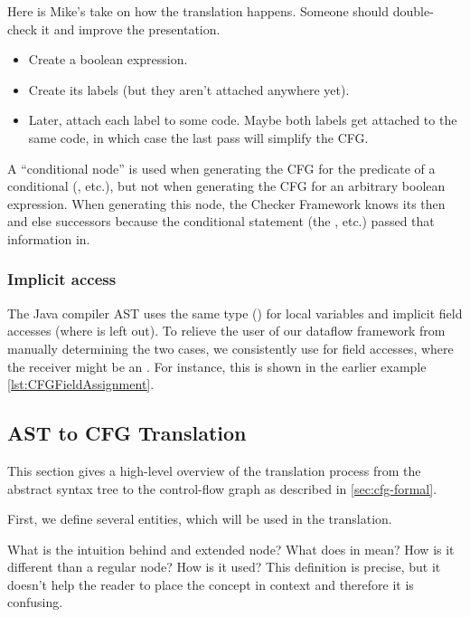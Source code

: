 \begin{workinprogress}
Here is Mike's take on how the translation happens.  Someone should
double-check it and improve the presentation.
\begin{itemize}
\item
Create a boolean expression.
\item
Create its labels (but they aren't attached anywhere yet).
\item
Later, attach each label to some code.
Maybe both labels get attached to the same code, in which case the last
pass will simplify the CFG.
\end{itemize}

A ``conditional node'' is used when generating the CFG for the predicate of
a conditional (, etc.), but not when generating the CFG for an
arbitrary boolean expression.  When generating this node, the Checker
Framework knows its then and else successors because the conditional
statement (the , etc.) passed that information in.

\end{workinprogress}


\subsubsection{Implicit  access}

The Java compiler AST uses the same type () for local variables
and implicit field accesses (where  is left out).
To relieve the user of our dataflow framework from manually determining
the two cases, we consistently use  for field accesses,
where the receiver might be an .
For instance, this is shown in the earlier example \autoref{lst:CFGFieldAssignment}.



\subsection{AST to CFG Translation}
\label{sec:ast_to_cfg_translation}

This section gives a high-level overview of the translation process from the
abstract syntax tree to the control-flow graph as described in \autoref{sec:cfg-formal}.

First, we define several entities, which will be used in the translation.

\begin{workinprogress}
What is the intuition behind and extended node?  What does in mean?  How is
it different than a regular node?  How is it used?  This definition is
precise, but it doesn't help the reader to place the concept in context and
therefore it is confusing.
\end{workinprogress}

